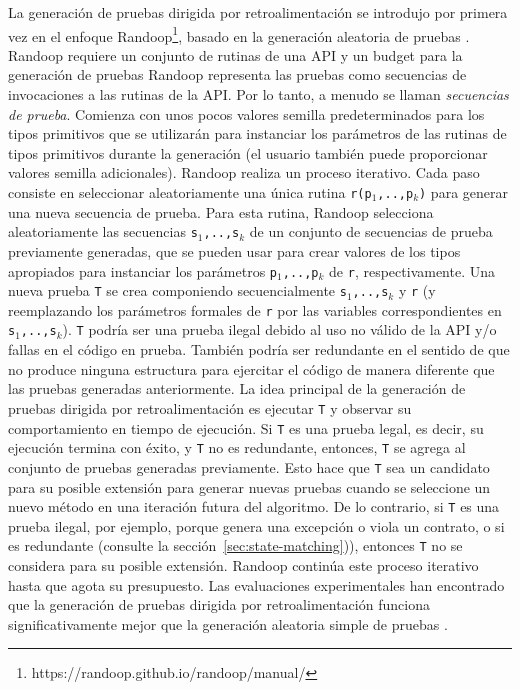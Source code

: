 La generación de pruebas dirigida por retroalimentación se introdujo por primera vez en el enfoque \textsf{Randoop}\footnote{https://randoop.github.io/randoop/manual/}, basado en la generación aleatoria de pruebas \cite{Pacheco07}. \textsf{Randoop} requiere un conjunto de rutinas de una API y un budget para la generación de pruebas 
\textsf{Randoop} representa las pruebas como secuencias de invocaciones a las rutinas de la API. Por lo tanto, a menudo se llaman \emph{secuencias de prueba}. Comienza con unos pocos valores semilla predeterminados para los tipos primitivos que se utilizarán para instanciar los parámetros de las rutinas de tipos primitivos durante la generación (el usuario también puede proporcionar valores semilla adicionales). \textsf{Randoop} realiza un proceso iterativo. Cada paso consiste en seleccionar aleatoriamente una única rutina \texttt{r(p$_1$,..,p$_k$)} para generar una nueva secuencia de prueba. Para esta rutina, \textsf{Randoop} selecciona aleatoriamente las secuencias \texttt{s$_1$,..,s$_k$} de un conjunto de secuencias de prueba previamente generadas, que se pueden usar para crear valores de los tipos apropiados para instanciar los parámetros \texttt{p$_1$,..,p$_k$} de \texttt{r}, respectivamente. Una nueva prueba \texttt{T} se crea componiendo secuencialmente \texttt{s$_1$,..,s$_k$} y \texttt{r} (y reemplazando los parámetros formales de \texttt{r} por las variables correspondientes en \texttt{s$_1$,..,s$_k$}). \texttt{T} podría ser una prueba ilegal debido al uso no válido de la API y/o fallas en el código en prueba. También podría ser redundante en el sentido de que no produce ninguna estructura para ejercitar el código de manera diferente que las pruebas generadas anteriormente.
La idea principal de la generación de pruebas dirigida por retroalimentación es ejecutar \texttt{T} y observar su comportamiento en tiempo de ejecución. Si \texttt{T} es una prueba legal, es decir, su ejecución termina con éxito,
y \texttt{T} no es redundante, entonces, \texttt{T} se agrega al conjunto de pruebas generadas previamente. Esto hace que \texttt{T} sea un candidato para su posible extensión para generar nuevas pruebas cuando se seleccione un nuevo método en una iteración futura del algoritmo. De lo contrario, si \texttt{T} es una prueba ilegal, por ejemplo, porque genera una excepción o viola un contrato, o si es redundante (consulte la sección~\ref{sec:state-matching})), entonces \texttt{T} no se considera para su posible extensión. \textsf{Randoop} continúa este proceso iterativo hasta que agota su presupuesto. Las evaluaciones experimentales han encontrado que la generación de pruebas dirigida por retroalimentación funciona significativamente mejor que la generación aleatoria simple de pruebas \cite{Pacheco07,Pacheco08}.
